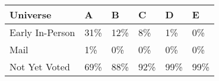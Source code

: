 \begin{tabular}{llllll}
\toprule
Universe & A & B & C & D & E \\
\midrule
Early In-Person & 31\% & 12\% & 8\% & 1\% & 0\% \\
Mail & 1\% & 0\% & 0\% & 0\% & 0\% \\
Not Yet Voted & 69\% & 88\% & 92\% & 99\% & 99\% \\
\end{tabular}
